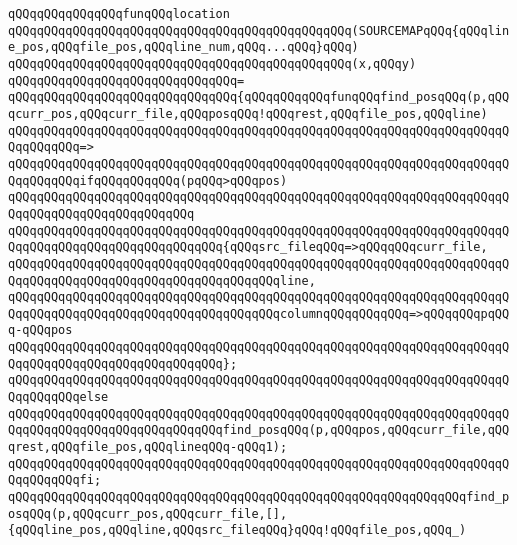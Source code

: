 \newline
\newline
\verb|qQQqqQQqqQQqqQQqfunqQQqlocation|\newline
\verb|qQQqqQQqqQQqqQQqqQQqqQQqqQQqqQQqqQQqqQQqqQQqqQQq(SOURCEMAPqQQq{qQQqline_pos,qQQqfile_pos,qQQqline_num,qQQq...qQQq}qQQq)|\newline
\verb|qQQqqQQqqQQqqQQqqQQqqQQqqQQqqQQqqQQqqQQqqQQqqQQq(x,qQQqy)|\newline
\verb|qQQqqQQqqQQqqQQqqQQqqQQqqQQqqQQq=|\newline
\verb|qQQqqQQqqQQqqQQqqQQqqQQqqQQqqQQq{qQQqqQQqqQQqfunqQQqfind_posqQQq(p,qQQqcurr_pos,qQQqcurr_file,qQQqposqQQq!qQQqrest,qQQqfile_pos,qQQqline)|\newline
\verb|qQQqqQQqqQQqqQQqqQQqqQQqqQQqqQQqqQQqqQQqqQQqqQQqqQQqqQQqqQQqqQQqqQQqqQQqqQQqqQQq=>|\newline
\verb|qQQqqQQqqQQqqQQqqQQqqQQqqQQqqQQqqQQqqQQqqQQqqQQqqQQqqQQqqQQqqQQqqQQqqQQqqQQqqQQqifqQQqqQQqqQQq(pqQQq>qQQqpos)|\newline
\verb|qQQqqQQqqQQqqQQqqQQqqQQqqQQqqQQqqQQqqQQqqQQqqQQqqQQqqQQqqQQqqQQqqQQqqQQqqQQqqQQqqQQqqQQqqQQqqQQq|\newline
\verb|qQQqqQQqqQQqqQQqqQQqqQQqqQQqqQQqqQQqqQQqqQQqqQQqqQQqqQQqqQQqqQQqqQQqqQQqqQQqqQQqqQQqqQQqqQQqqQQqqQQq{qQQqsrc_fileqQQq=>qQQqqQQqcurr_file,|\newline
\verb|qQQqqQQqqQQqqQQqqQQqqQQqqQQqqQQqqQQqqQQqqQQqqQQqqQQqqQQqqQQqqQQqqQQqqQQqqQQqqQQqqQQqqQQqqQQqqQQqqQQqqQQqqQQqline,|\newline
\verb|qQQqqQQqqQQqqQQqqQQqqQQqqQQqqQQqqQQqqQQqqQQqqQQqqQQqqQQqqQQqqQQqqQQqqQQqqQQqqQQqqQQqqQQqqQQqqQQqqQQqqQQqqQQqcolumnqQQqqQQqqQQq=>qQQqqQQqpqQQq-qQQqpos|\newline
\verb|qQQqqQQqqQQqqQQqqQQqqQQqqQQqqQQqqQQqqQQqqQQqqQQqqQQqqQQqqQQqqQQqqQQqqQQqqQQqqQQqqQQqqQQqqQQqqQQqqQQq};|\newline
\verb|qQQqqQQqqQQqqQQqqQQqqQQqqQQqqQQqqQQqqQQqqQQqqQQqqQQqqQQqqQQqqQQqqQQqqQQqqQQqqQQqelse|\newline
\verb|qQQqqQQqqQQqqQQqqQQqqQQqqQQqqQQqqQQqqQQqqQQqqQQqqQQqqQQqqQQqqQQqqQQqqQQqqQQqqQQqqQQqqQQqqQQqqQQqqQQqfind_posqQQq(p,qQQqpos,qQQqcurr_file,qQQqrest,qQQqfile_pos,qQQqlineqQQq-qQQq1);|\newline
\verb|qQQqqQQqqQQqqQQqqQQqqQQqqQQqqQQqqQQqqQQqqQQqqQQqqQQqqQQqqQQqqQQqqQQqqQQqqQQqqQQqfi;|\newline
\newline
\verb|qQQqqQQqqQQqqQQqqQQqqQQqqQQqqQQqqQQqqQQqqQQqqQQqqQQqqQQqqQQqqQQqfind_posqQQq(p,qQQqcurr_pos,qQQqcurr_file,[],{qQQqline_pos,qQQqline,qQQqsrc_fileqQQq}qQQq!qQQqfile_pos,qQQq_)|\newline
